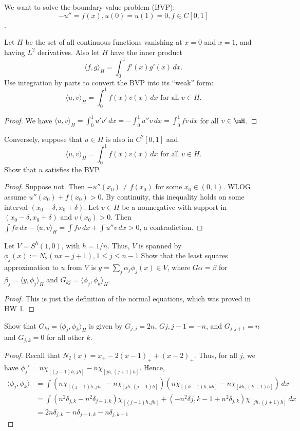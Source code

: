\documentclass{article}
\begin{document}
 We want to solve the boundary value problem (BVP): 
$$-u'' = f(x), u(0) = u(1) = 0, f \in C[0,1]$$.

 Let $H$ be the set of all continuous functions vanishing at $x = 0$ and $x = 1$, and having $L^2$ derivatives. Also let $H$ have the inner product
$$\langle f, g \rangle_H = \int_0^1 f'(x) g'(x) \, dx.$$
Use integration by parts to convert the BVP into its ``weak'' form:
$$\langle u, v \rangle_H = \int_0^1 f(x) v(x) \, dx \text{ for all } v \in H.$$
\begin{proof}
We have $\langle u, v \rangle_H = \int_0^1 u' v' \, dx =  - \int_0^1 u'' v \, dx = \int_0^1 f v \, dx$ for all $v \in \mH$.
\end{proof}

 Conversely, suppose that $u \in H$ is also in $C^2[0,1]$ and 
$$\langle u, v \rangle_H  = \int_0^1 f(x) v(x) \, dx \text{ for all } v \in H.$$
Show that $u$ satisfies the BVP.
\begin{proof}
Suppose not. Then $-u''(x_0) \neq f(x_0)$ for some $x_0 \in (0,1)$. WLOG assume $u''(x_0) + f(x_0) > 0$.  By continuity, this inequality holds on some interval $(x_0 - \delta, x_0 + \delta)$. Let $v \in H$ be a nonnegative with support in $(x_0 - \delta, x_0 + \delta)$ and $v(x_0) > 0$.  Then $\int f v \, dx - \langle u, v \rangle_H = \int f v \, dx + \int u'' v \, dx  > 0$, a contradiction.
\end{proof}


 Let $V = S^h(1,0)$, with $h = 1/n$. Thus, $V$ is spanned by $\phi_j(x) := N_2(nx - j+1), 1 \le j \le n-1 $ Show that the least squares approximation to $u$ from $V$ is $y = \sum_j \alpha_j \phi_j(x) \in V$, where $G \alpha = \beta$ for $\beta_j = \langle y , \phi_j \rangle_H$ and $G_{kj} = \langle \phi_j, \phi_k \rangle_H$.

\begin{proof}
This is just the definition of the normal equations, which was proved in HW 1.
\end{proof}

 Show that $G_{kj} = \langle \phi_j, \phi_k \rangle_H$ is given by
$G_{j,j} = 2n$, $G{j,j-1} = -n$, and $G_{j, j+1} = n$ and $G_{j,k} = 0$ for all other $k$.
\begin{proof}
Recall that $N_2(x) = x_+ - 2(x-1)_+ + (x-2)_+$. Thus, for all $j$, we have $\phi_j' = n \chi_{[(j-1)h, jh]} -n \chi_{[jh, (j+1)h]}$.  
Hence,
\begin{align*}
\langle \phi_j, \phi_k \rangle  & = \int (n \chi_{[(j-1)h, jh]} -n \chi_{[jh, (j+1)h]})(n \chi_{[(k-1)h, kh]} -n \chi_{[kh, (k+1)h]}) \, dx
\\ & = \int (n^2 \delta_{j,k} - n^2 \delta_{j-1, k}) \chi_{[(j-1)h, jh]}  + ( -n^2 \delta{j, k - 1} + n^2 \delta_{j,k})\chi_{[jh, (j+1)h]} \, dx
\\ & = 2n \delta_{j,k} - n \delta_{j-1, k} -n \delta_{j, k-1}
\end{align*}
\end{proof}
\end{document}
